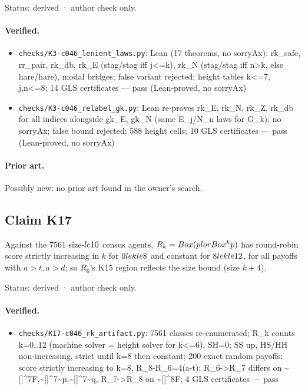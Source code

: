 \documentclass{article}
\begin{document}
Status: derived · author check only.

\paragraph{Verified.}
\begin{itemize}
\item \texttt{checks/K3-c046\_lenient\_laws.py}: Lean (17 theorems, no sorryAx): rk\_safe, rr\_pair, rk\_db, rk\_E (stag/stag iff j\textless{}=k), rk\_N (stag/stag iff n\textgreater{}k, else hare/hare), modal bridges; false variant rejected; height tables k\textless{}=7, j,n\textless{}=8; 14 GLS certificates --- pass (Lean-proved, no sorryAx)
\item \texttt{checks/K3-c046\_relabel\_gk.py}: Lean re-proves rk\_E, rk\_N, rk\_Z, rk\_db for all indices alongside gk\_E, gk\_N (same E\_j/N\_n laws for G\_k); no sorryAx; false bound rejected; 588 height cells; 10 GLS certificates --- pass (Lean-proved, no sorryAx)
\end{itemize}

\paragraph{Prior art.} Possibly new: no prior art found in the owner's search.

\subsection*{Claim K17}

Against the 7561 size-$\\le10$ census agents, $R_k=\\Box(p\\lor\\Box^kp)$ has round-robin score strictly increasing in $k$ for $0\\le k\\le8$ and constant for $8\\le k\\le12$, for all payoffs with $a>t,a>d$; so $R_6$'s K15 region reflects the size bound (size $k+4$).

Status: derived · author check only.

\paragraph{Verified.}
\begin{itemize}
\item \texttt{checks/K17-c046\_rk\_artifact.py}: 7561 classes re-enumerated; R\_k counts k=0..12 (machine solver = height solver for k\textless{}=6), SH=0; SS up, HS/HH non-increasing, strict until k=8 then constant; 200 exact random payoffs: score strictly increasing to k=8, R\_8-R\_6=4(a-t); R\_6-\textgreater{}R\_7 differs on \textasciitilde{}[]\textasciicircum{}7F,\textasciitilde{}[]\textasciicircum{}7\textasciitilde{}p,\textasciitilde{}[]\textasciicircum{}7\textasciitilde{}q, R\_7-\textgreater{}R\_8 on \textasciitilde{}[]\textasciicircum{}8F; 4 GLS certificates --- pass
\end{itemize}
\end{document}
